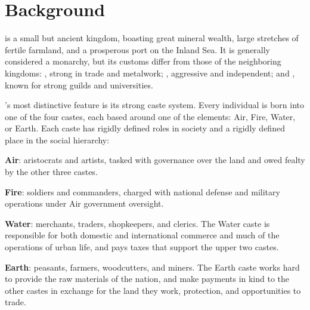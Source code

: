 \documentclass[sheet]{iron}
\begin{document}
\parskip 0pt


\section{Background}

\sHomeCountry{} is a small but ancient kingdom, boasting great mineral
wealth, large stretches of fertile farmland, and a prosperous port on
the Inland Sea.  It is generally considered a monarchy, but its customs
differ from those of the neighboring kingdoms: \sTreatyCountry{},
strong in trade and metalwork;
\sMulanCountry{}, aggressive and independent; and \sSpyCountry{},
known for strong guilds and universities.

\sHomeCountry{}'s most distinctive feature is its strong caste system.
Every individual is born into one of the four castes, each based around
one of the elements: Air, Fire, Water, or Earth.  Each caste has rigidly
defined roles in society and a rigidly defined place in the social hierarchy:

\begin{itemz}
\item \textbf{Air}: aristocrats and artists, tasked with governance over the
  land and owed fealty by the other three castes.
\item \textbf{Fire}: soldiers and commanders, charged with national defense
  and military operations under Air government oversight.
\item \textbf{Water}: merchants, traders, shopkeepers, and clerics.  The Water
  caste is responsible for both domestic and international commerce and much
  of the operations of urban life, and pays taxes that support the upper two
  castes.
\item \textbf{Earth}: peasants, farmers, woodcutters, and miners.  The
  Earth caste works hard to provide the raw materials of the nation,
  and make payments in kind to the other castes in exchange for
  the land they work, protection, and opportunities
  to trade.
\end{itemz}
\end{document}
